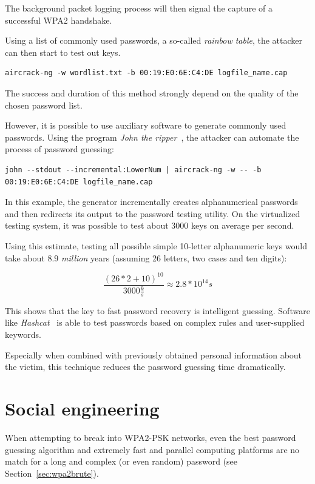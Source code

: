 The background packet logging process will then signal the capture of a successful WPA2 handshake.

Using a list of commonly used passwords, a so-called \emph{rainbow table}, the attacker can then start to test out keys.

\begin{lstlisting}
aircrack-ng -w wordlist.txt -b 00:19:E0:6E:C4:DE logfile_name.cap
\end{lstlisting}

The success and duration of this method strongly depend on the quality of the chosen password list.

However, it is possible to use auxiliary software to generate commonly used passwords. Using the program \emph{John the ripper}~\cite{Openwall17}, the attacker can automate the process of password guessing:

\begin{lstlisting}
john --stdout --incremental:LowerNum | aircrack-ng -w -- -b 00:19:E0:6E:C4:DE logfile_name.cap
\end{lstlisting}

In this example, the generator incrementally creates alphanumerical passwords and then redirects its output to the password testing utility. On the virtualized testing system, it was possible to test about 3000 keys on average per second.

Using this estimate, testing all possible simple 10-letter alphanumeric keys would take about \(8.9\) \emph{million} years (assuming 26 letters, two cases and ten digits):

\begin{displaymath}
\frac{{(26 * 2 + 10)}^{10}}{3000\frac{k}{s}}\approx2.8*10^{14} s
\end{displaymath}

This shows that the key to fast password recovery is intelligent guessing. Software like \emph{Hashcat}~\cite{Steube17} is able to test passwords based on complex rules and user-supplied keywords.

Especially when combined with previously obtained personal information about the victim, this technique reduces the password guessing time dramatically.

\section{Social engineering}\label{sec:attackuser}

When attempting to break into WPA2-PSK networks, even the best password guessing algorithm and extremely fast and parallel computing platforms are no match for a long and complex (or even random) password (see Section~\ref{sec:wpa2brute}).

